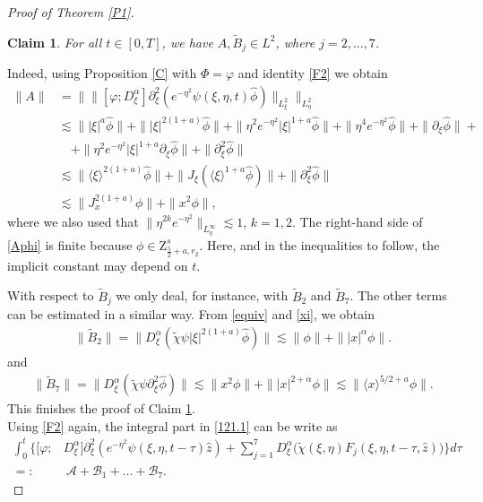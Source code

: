 \documentclass[reqno]{amsart}
\newcommand{\ha}{\hat{\phi}}
\newcommand{\va}{\varphi}
\newcommand{\les}{\lesssim}
\newcommand{\lan}{\langle \xi \rangle}
\newcommand{\lanx}{\langle x \rangle}
\newcommand{\ti}{\tilde {\chi}}
\newcommand{\dt}{D^{\alpha}_\xi}
\newcommand{\p}{\partial}
\numberwithin{equation}{section}
\newtheorem{claim}[theorem]{Claim}
\begin{document}
\begin{proof}[Proof of Theorem \ref{P1}]
\begin{claim}\label{claim1}
For all $t\in [0,T]$, we have $A,\tilde B_j\in L^2$, where $j=2,...,7$. 
\end{claim}
Indeed, using Proposition \ref{C} with $\Phi=\varphi$ and identity \eqref{F2} we obtain 
\begin{equation}
\begin{split}\label{Aphi}
\|A\|&=\|\|[\varphi;D_{\xi}^{\alpha}]\partial_{\xi}^2(e^{-\eta^2}\psi(\xi,\eta,t) \hat{\phi})\|_{L^2_\xi}\|_{L^2_\eta}\\ 
&\les\||\xi|^a \ha\|+\||\xi|^{2(1+a)}\ha\|+\|\eta^2 e^{-\eta^2}|\xi|^{1+a}\ha\|+\|\eta^4 e^{-\eta^2}\ha\|+\|\p_\xi \ha\|+\\
&\quad +\|\eta^2 e^{-\eta^2}|\xi|^{1+a}\p_\xi \ha\|+\|\p_\xi^2 \ha\|\\
&\les \|\lan^{2(1+a)}\ha\|+\|J_\xi(\lan^{1+a}\ha)\|+\|\p_\xi^2 \ha\|\\
&\les \|J_x^{2(1+a)}\phi\|+\|x^2 \phi\|,
\end{split}
\end{equation}
where  we also used that $\|\eta^{2k} e^{-\eta^2}\|_{L^\infty_\eta}\les 1$, $k=1,2$. The right-hand side of \eqref{Aphi} is finite because $\phi\in \mathrm{Z}^s_{\frac{5}{2}+a,r_2}$. Here, and in the inequalities to follow, the implicit constant may depend on $t$.

With respect to $\tilde B_j$ we  only deal,  for instance, with $\tilde B_2$ and $\tilde B_7$. The other terms can be estimated in a similar way. From \eqref{equiv} and \eqref{xi}, we obtain
\begin{equation*}
\begin{split}
\|\tilde B_2\|=\|\dt (\tilde{\chi} \psi |\xi|^{2(1+a)}\ha)\|
\lesssim \|\phi\|+\| |x|^\alpha\phi\|.
\end{split}
\end{equation*}
and
\begin{equation*}
\begin{split}
\|\tilde{B}_7\|=\|\dt (\ti \psi \p_\xi^2 \ha )\|
\lesssim \|x^2\phi\|+\||x|^{2+\alpha}\phi\|
\les\|\lanx^{5/2+a}\phi\|.
\end{split}
\end{equation*}
This finishes the proof of Claim \ref{claim1}.\\



Using \eqref{F2} again, the integral part in \eqref{121.1} can be write as
\begin{equation*}
\begin{split}
\int_{0}^{t}\Bigg\{[\va;&D_{\xi}^{\alpha}]\p_\xi^2(e^{-\eta^2}\psi(\xi,\eta,t-\tau)\hat{z})+\sum_{j=1}^{7}D_{\xi}^{\alpha}\Big( \tilde{\chi}(\xi,\eta)F_j(\xi,\eta,t-\tau,\hat{z})  \Big)\Bigg\}d\tau\\
=:&\ \mathcal A+\mathcal B_1+\dots+\mathcal B_7.
\end{split}
\end{equation*}


\end{proof}
\end{document}
